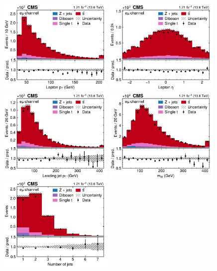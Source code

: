 \begin{figure}[!p]
\centering
\includegraphics[width=0.49\textwidth]{figures/ttxs/lep_pt_em.pdf}
\hfill
\includegraphics[width=0.49\textwidth]{figures/ttxs/lep_eta_em.pdf}
\includegraphics[width=0.49\textwidth]{figures/ttxs/1st_jet_pt_em.pdf}
\hfill
\includegraphics[width=0.49\textwidth]{figures/ttxs/mll_em.pdf}
\includegraphics[width=0.49\textwidth]{figures/ttxs/njet_em.pdf}

\end{figure}
